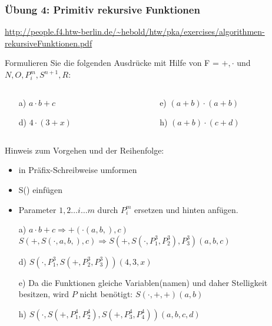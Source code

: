 \begin{card}
	\frametitle{Übung 4: Primitiv rekursive Funktionen}
	\url{http://people.f4.htw-berlin.de/~hebold/htw/pka/exercises/algorithmen-rekursiveFunktionen.pdf}
\end{card}

\begin{card}
  Formulieren Sie die folgenden Ausdrücke mit Hilfe von F = ${+, \cdot}$ und ${N, O, P^m_i, S^{n+1}, R}$:
	\begin{columns}
		\begin{column}{.5\linewidth}
			\begin{enumerate}[a)]
   			 \item[a)] $a \cdot b + c$
   			 \item[d)] $4 \cdot (3 + x)$
   			\end{enumerate}
   		\end{column}
   		\begin{column}{.5\linewidth}
			\begin{enumerate}[a)]
			\item[e)] $(a + b) \cdot (a + b)$
			\item[h)] $(a + b) \cdot (c + d)$
   			\end{enumerate}
		\end{column}
	\end{columns}
	\hr
	Hinweis zum Vorgehen und der Reihenfolge:
	\begin{itemize}
	\item in Präfix-Schreibweise umformen
	\item S() einfügen
	\item Parameter $1, 2 \dots i \dots m$ durch $P^m_i$ ersetzen und hinten anfügen.
	\end{itemize}
	
	\begin{enumerate}[a)]
    \item[a)] 
    	$a \cdot b + c \Rightarrow +(\cdot(a,b,),c)$\\
    	$S(+,S(\cdot,a,b,),c) \Rightarrow S(+, S(\cdot, P^3_1, P^3_2), P^3_3)(a, b, c)$
    	\vfill
    \item[d)] $S(\cdot, P^3_1, S(+, P^3_2, P^3_3))(4, 3, x)$
    \item[e)] 
    	Da die Funktionen gleiche Variablen(namen) und daher Stelligkeit besitzen, wird $P$ nicht benötigt: $S(\cdot, +, +)(a, b)$
    \item[h)] $S(\cdot, S(+, P^4_1, P^4_2), S(+, P^4_3, P^4_4))(a, b, c, d)$
	\end{enumerate}
\end{card}

